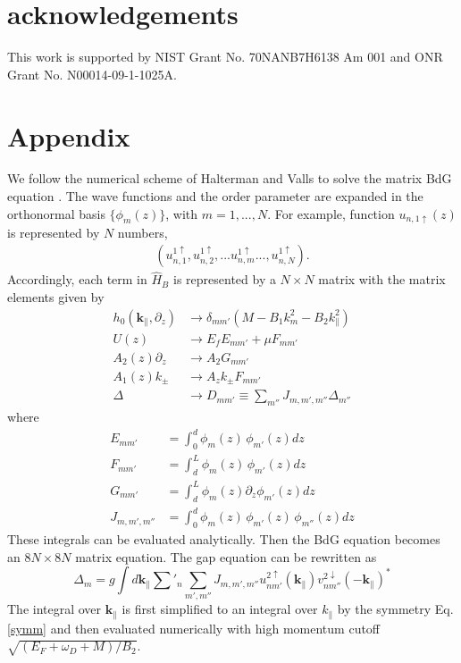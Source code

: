 \documentclass[12pt,twocolumn]{article}
\newcommand{\kperp}{\mathbf{k}_\parallel}
\begin{document}
\section{acknowledgements}
This work is supported by NIST Grant No. 70NANB7H6138 Am 001 
and ONR Grant No. N00014-09-1-1025A. 

\appendix*
\section*{Appendix}
We follow the numerical scheme of Halterman and Valls to solve 
the matrix BdG equation \cite{h-v}. The wave functions and the order parameter
are expanded in the orthonormal basis $\{\phi_m(z)\}$, with $m=1,...,N$. For example,
function $u_{n,1\uparrow}(z)$ is represented by $N$ numbers,
\begin{eqnarray*}
(u^{1\uparrow}_{n,1},u^{1\uparrow}_{n,2},...u^{1\uparrow}_{n,m}...,u^{1\uparrow}_{n,N}).
\end{eqnarray*}
Accordingly, each term in $\hat{H}_{B}$ is represented
by a $N\times N$ matrix with the matrix elements given by
\begin{eqnarray*}
h_0(\kperp,\partial_z) &\rightarrow \delta_{mm'}(M - B_1 k_m^2 - B_2 k_\parallel^2) \\
U(z) &\rightarrow E_f E_{mm'} + \mu F_{mm'} \\
 A_2(z) \partial_z &\rightarrow A_2 G_{mm'}\\
 A_1(z) k_\pm &\rightarrow A_z k_\pm F_{mm'} \\
 \Delta &\rightarrow D_{mm'}\equiv \sum_{m''}J_{m,m',m''}\Delta_{m''}
\end{eqnarray*}
where 
\begin{eqnarray*}
E_{mm'}&=\int_0^{d} \phi_m(z) \, \phi_{m'}(z) dz \\
F_{mm'}&=\int_d^{L} \phi_m(z) \, \phi_{m'}(z) dz \\
G_{mm'}&=\int_d^{L} \phi_m(z) \partial_z \phi_{m'}(z) dz\\
J_{m,m',m''}&=\int_0^{d} \phi_m(z) \, \phi_{m'}(z) \, \phi_{m''}(z) dz
\end{eqnarray*}
These integrals can be evaluated analytically. Then the BdG equation becomes
an $8N\times 8N$ matrix equation. The gap equation can be rewritten as
\[
\Delta_{m}=g\int d\kperp \sum'_n \sum_{m',m''} J_{m,m',m''}
u^{2\uparrow}_{nm'}(\kperp)v^{2\downarrow}_{nm''}(-\kperp)^* 
\]
The integral over $\kperp$ is first simplified to an integral over $k_\parallel$
by the symmetry Eq. \eqref{symm} and then evaluated numerically with high 
momentum cutoff 
$\sqrt{(E_F+\omega_D+M)/B_2}$.
\end{document}
